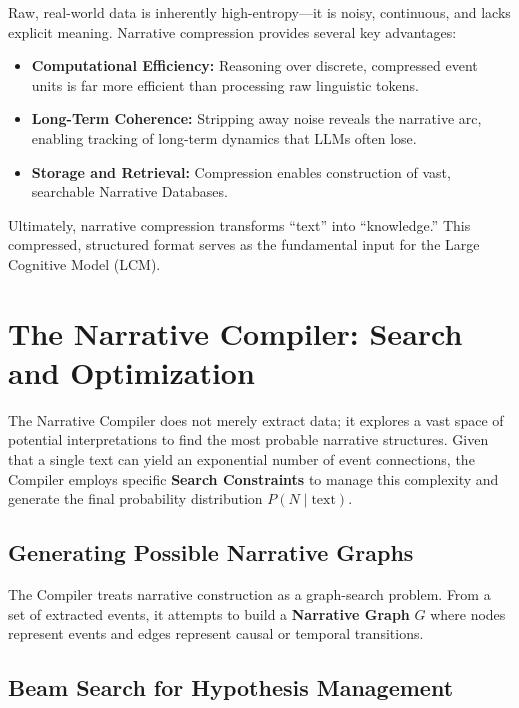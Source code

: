 \documentclass[11pt,a4paper]{article}
\begin{document}
Raw, real-world data is inherently high-entropy---it is noisy,
continuous, and lacks explicit meaning. Narrative compression provides
several key advantages:

\begin{itemize}[noitemsep]
  \item \textbf{Computational Efficiency:} Reasoning over discrete, compressed event units is far more efficient than processing raw linguistic tokens.
  \item \textbf{Long-Term Coherence:} Stripping away noise reveals the narrative arc, enabling tracking of long-term dynamics that LLMs often lose.
  \item \textbf{Storage and Retrieval:} Compression enables construction of vast, searchable Narrative Databases.
\end{itemize}

Ultimately, narrative compression transforms ``text'' into
``knowledge.'' This compressed, structured format serves as the
fundamental input for the Large Cognitive Model (LCM).

\section{The Narrative Compiler: Search and Optimization}

The Narrative Compiler does not merely extract data; it explores a vast
space of potential interpretations to find the most probable narrative
structures. Given that a single text can yield an exponential number of
event connections, the Compiler employs specific \textbf{Search
Constraints} to manage this complexity and generate the final
probability distribution $P(N \mid \text{text})$.

\subsection{Generating Possible Narrative Graphs}

The Compiler treats narrative construction as a graph-search problem.
From a set of extracted events, it attempts to build a \textbf{Narrative
Graph} $G$ where nodes represent events and edges represent causal or
temporal transitions.

\subsection{Beam Search for Hypothesis Management}
\end{document}
